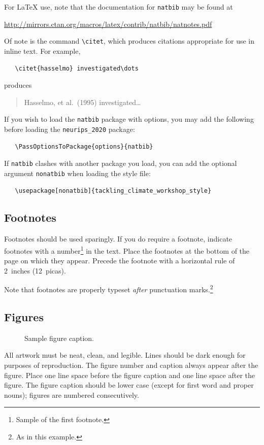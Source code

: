 \documentclass{article}
\begin{document}
For \LaTeX{} use, note that the documentation for \verb+natbib+ may be found at
\begin{center}
  \url{http://mirrors.ctan.org/macros/latex/contrib/natbib/natnotes.pdf}
\end{center}
Of note is the command \verb+\citet+, which produces citations appropriate for
use in inline text.  For example,
\begin{verbatim}
   \citet{hasselmo} investigated\dots
\end{verbatim}
produces
\begin{quote}
  Hasselmo, et al.\ (1995) investigated\dots
\end{quote}

If you wish to load the \verb+natbib+ package with options, you may add the
following before loading the \verb+neurips_2020+ package:
\begin{verbatim}
   \PassOptionsToPackage{options}{natbib}
\end{verbatim}

If \verb+natbib+ clashes with another package you load, you can add the optional
argument \verb+nonatbib+ when loading the style file:
\begin{verbatim}
   \usepackage[nonatbib]{tackling_climate_workshop_style}
\end{verbatim}

\subsection{Footnotes}

Footnotes should be used sparingly.  If you do require a footnote, indicate
footnotes with a number\footnote{Sample of the first footnote.} in the
text. Place the footnotes at the bottom of the page on which they appear.
Precede the footnote with a horizontal rule of 2~inches (12~picas).

Note that footnotes are properly typeset \emph{after} punctuation
marks.\footnote{As in this example.}

\subsection{Figures}

\begin{figure}
  \centering
  \fbox{\rule[-.5cm]{0cm}{4cm} \rule[-.5cm]{4cm}{0cm}}
  \caption{Sample figure caption.}
\end{figure}

All artwork must be neat, clean, and legible. Lines should be dark enough for
purposes of reproduction. The figure number and caption always appear after the
figure. Place one line space before the figure caption and one line space after
the figure. The figure caption should be lower case (except for first word and
proper nouns); figures are numbered consecutively.
\end{document}
